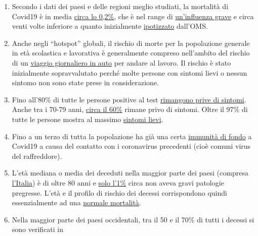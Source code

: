 \begin{enumerate}
\def\labelenumi{\arabic{enumi}.}
\tightlist
\item
  Secondo i dati dei paesi e delle regioni meglio studiati, la mortalità
  di Covid19 è in media
  \href{https://swprs.org/studies-on-covid-19-lethality/}{circa lo
  0,2\%}, che è nel range di
  \href{https://www.ebm-netzwerk.de/en/publications/covid-19}{un'influenza
  grave} e circa venti volte inferiore a quanto inizialmente
  \href{https://www.businessinsider.com/coronavirus-death-rate-by-age-countries-2020-3}{ipotizzato}
  dall'OMS.
\item
  Anche negli ``hotspot'' globali, il rischio di morte per la
  popolazione generale in età scolastica e lavorativa è generalmente
  compreso nell'ambito del rischio di un
  \href{https://www.medrxiv.org/content/10.1101/2020.04.05.20054361v1}{viaggio
  giornaliero in auto} per andare al lavoro. Il rischio è stato
  inizialmente sopravvalutato perché molte persone con sintomi lievi o
  nessun sintomo non sono state prese in considerazione.
\item
  Fino all'80\% di tutte le persone positive al test
  \href{https://www.bmj.com/content/369/bmj.m1375}{rimangono prive di
  sintomi}. Anche tra i 70-79 anni,
  \href{https://www.niid.go.jp/niid/en/2019-ncov-e/9407-covid-dp-fe-01.html}{circa
  il 60\%} rimane privo di sintomi. Oltre il 97\% di tutte le persone
  mostra al massimo
  \href{https://swprs.org/studies-on-covid-19-lethality/\#hospitalizations}{sintomi
  lievi}.
\item
  Fino a un terzo di tutta la popolazione ha già una certa
  \href{https://www.medrxiv.org/content/10.1101/2020.04.17.20061440v1}{immunità
  di fondo} a Covid19 a causa del contatto con i coronavirus precedenti
  (cioè comuni virus del raffreddore).
\item
  L'età mediana o media dei deceduti nella maggior parte dei paesi
  (compresa
  \href{https://www.epicentro.iss.it/coronavirus/sars-cov-2-decessi-italia}{l'Italia})
  è di oltre 80 anni e
  \href{https://www.bloomberg.com/news/articles/2020-03-18/99-of-those-who-died-from-virus-had-other-illness-italy-says}{solo
  l'1\%} circa non aveva gravi patologie pregresse. L'età e il profilo
  di rischio dei decessi corrispondono quindi essenzialmente ad una
  \href{https://www.vienna.at/analyse-zeigt-covid-19-opferkurve-entspricht-normaler-mortalitaet/6581246}{normale
  mortalità}.
\item
  Nella maggior parte dei paesi occidentali, tra il 50 e il 70\% di
  tutti i decessi si sono verificati in

\end{enumerate}
